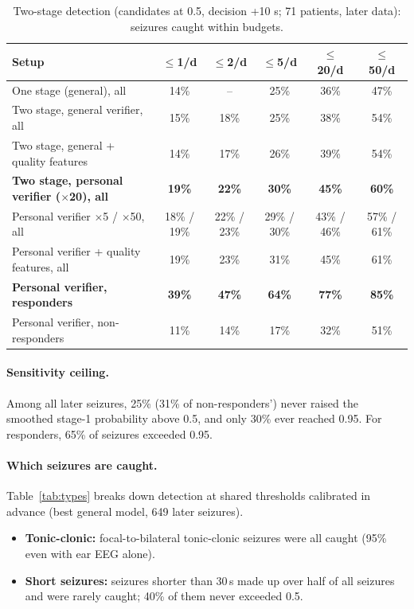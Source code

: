 \begin{table}[htbp]
\centering\small
\caption{Two-stage detection (candidates at 0.5, decision +10 s; 71 patients, later data): seizures caught within budgets.}
\label{tab:twostage}
\setlength{\tabcolsep}{4pt}
\begin{tabular}{@{}lccccc@{}}
\toprule
Setup & $\le$1/d & $\le$2/d & $\le$5/d & $\le$20/d & $\le$50/d \\
\midrule
One stage (general), all & 14\% & -- & 25\% & 36\% & 47\% \\
Two stage, general verifier, all & 15\% & 18\% & 25\% & 38\% & 54\% \\
Two stage, general + quality features & 14\% & 17\% & 26\% & 39\% & 54\% \\
\textbf{Two stage, personal verifier ($\times$20), all} & \textbf{19\%} & \textbf{22\%} & \textbf{30\%} & \textbf{45\%} & \textbf{60\%} \\
Personal verifier $\times$5 / $\times$50, all & 18\% / 19\% & 22\% / 23\% & 29\% / 30\% & 43\% / 46\% & 57\% / 61\% \\
Personal verifier + quality features, all & 19\% & 23\% & 31\% & 45\% & 61\% \\
\textbf{Personal verifier, responders} & \textbf{39\%} & \textbf{47\%} & \textbf{64\%} & \textbf{77\%} & \textbf{85\%} \\
Personal verifier, non-responders & 11\% & 14\% & 17\% & 32\% & 51\% \\
\bottomrule
\end{tabular}
\end{table}

\paragraph{Sensitivity ceiling.} Among all later seizures, 25\% (31\% of non-responders') never raised the smoothed stage-1 probability above 0.5, and only 30\% ever reached 0.95. For responders, 65\% of seizures exceeded 0.95.

\paragraph{Which seizures are caught.} Table~\ref{tab:types} breaks down detection at shared thresholds calibrated in advance (best general model, 649 later seizures).
\begin{itemize}
\item \textbf{Tonic-clonic:} focal-to-bilateral tonic-clonic seizures were all caught (95\% even with ear EEG alone).
\item \textbf{Short seizures:} seizures shorter than 30\,s made up over half of all seizures and were rarely caught; 40\% of them never exceeded 0.5.
\end{itemize}

